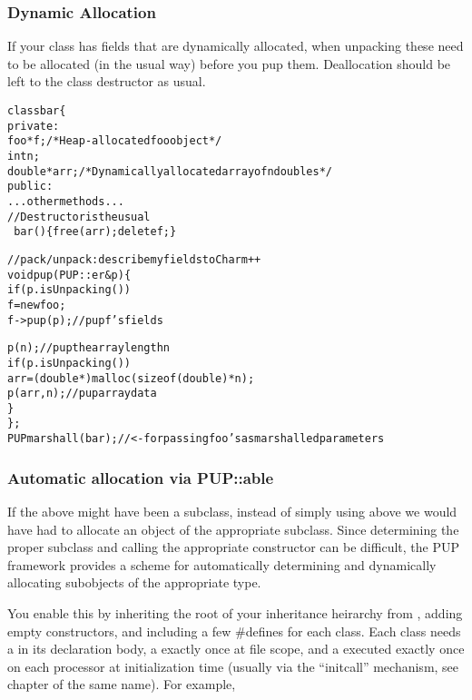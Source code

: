 \subsubsection{Dynamic Allocation}

If your class has fields that are dynamically allocated, when unpacking
these need to be allocated (in the usual way) before you pup them.
Deallocation should be left to the class destructor as usual.

\begin{alltt}
class bar \{
private:
    foo *f; /*Heap-allocated foo object*/
    int n;
    double *arr;/*Dynamically allocated array of n doubles*/
public:
    ...other methods...
    //Destructor is the usual
    ~bar() \{free(arr);delete f;\}
    
    //pack/unpack: describe my fields to Charm++
    void pup(PUP::er &p) \{
      if (p.isUnpacking()) 
         f=new foo;
      f->pup(p);//pup f's fields
      
      p(n);//pup the array length n
      if (p.isUnpacking()) 
         arr=(double *)malloc(sizeof(double)*n);
      p(arr,n);//pup array data
    \}
\};
PUPmarshall(bar); //<- for passing foo's as marshalled parameters
\end{alltt}


\subsubsection{Automatic allocation via PUP::able}
If the  above might have been a subclass, instead of
simply using  above we would have had to allocate 
an object of the appropriate subclass.  Since determining the
proper subclass and calling the appropriate constructor can be 
difficult, the PUP framework provides a scheme for automatically
determining and dynamically allocating subobjects of the appropriate type.

You enable this by inheriting the root of your inheritance heirarchy 
from , adding empty  constructors,
and including a few \#defines for each class.
Each class needs a  in its 
declaration body, a  exactly once
at file scope, and a  executed
exactly once on each processor at initialization time (usually
via the ``initcall'' mechanism, see chapter of the same name).
For example,

